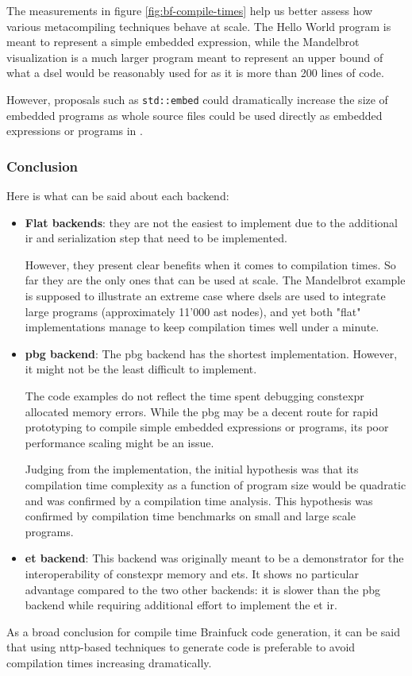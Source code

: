 \documentclass[../main]{subfiles}
\begin{document}
The measurements in figure \ref{fig:bf-compile-times} help us better assess
how various metacompiling techniques behave at scale.
The Hello World program is meant to represent a simple embedded expression,
while the Mandelbrot visualization is a much larger program meant to represent
an upper bound of what a \gls{dsel} would be reasonably used for as it is more
than 200 lines of code.

However, proposals such as \lstinline{std::embed} \cite{stdembed}
could dramatically increase the size of embedded programs as whole source files
could be used directly as embedded expressions or programs in \cpp.

\subsubsection{
  Conclusion
}

Here is what can be said about each backend:

\begin{itemize}

\item
\textbf{Flat backends}:
they are not the easiest to implement due to the additional \gls{ir}
and serialization step that need to be implemented.

However, they present clear benefits when it comes to compilation times.
So far they are the only ones that can be used at scale.
The Mandelbrot example is supposed to illustrate an extreme case where
\glspl{dsel} are used to integrate large programs (approximately 11'000
\gls{ast} nodes), and yet both "flat" implementations manage to keep compilation
times well under a minute.

\item
\textbf{\gls{pbg} backend}:
The \gls{pbg} backend has the shortest implementation.
However, it might not be the least difficult to implement.

The code examples do not reflect the time spent debugging \gls{constexpr}
allocated memory errors. While the \gls{pbg} may be a decent route for
rapid prototyping to compile simple embedded expressions or programs,
its poor performance scaling might be an issue.

Judging from the implementation, the initial hypothesis was that its
compilation time complexity as a function of program size would be quadratic
and was confirmed by a compilation time analysis.
This hypothesis was confirmed by compilation time benchmarks on small
and large scale programs.

\item
\textbf{\gls{et} backend}:
This backend was originally meant to be a demonstrator for the interoperability
of \gls{constexpr} memory and \glspl{et}. It shows no particular advantage
compared to the two other backends: it is slower than the \gls{pbg} backend while
requiring additional effort to implement the \gls{et}
\gls{ir}.

\end{itemize}

As a broad conclusion for compile time Brainfuck code generation,
it can be said that using \gls{nttp}-based techniques to generate code
is preferable to avoid compilation times increasing dramatically.
\end{document}
